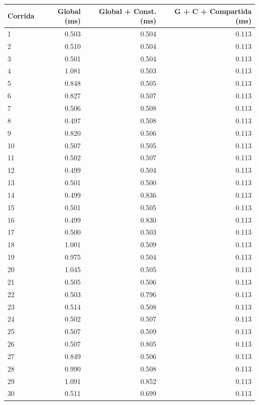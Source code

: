 \begin{tabular}{lrrr}
\toprule
Corrida & Global (ms) & Global + Const. (ms) & G + C + Compartida (ms) \\
\midrule
1 & 0.503 & 0.504 & 0.113 \\
2 & 0.510 & 0.504 & 0.113 \\
3 & 0.501 & 0.504 & 0.113 \\
4 & 1.081 & 0.503 & 0.113 \\
5 & 0.848 & 0.505 & 0.113 \\
6 & 0.827 & 0.507 & 0.113 \\
7 & 0.506 & 0.508 & 0.113 \\
8 & 0.497 & 0.508 & 0.113 \\
9 & 0.820 & 0.506 & 0.113 \\
10 & 0.507 & 0.505 & 0.113 \\
11 & 0.502 & 0.507 & 0.113 \\
12 & 0.499 & 0.504 & 0.113 \\
13 & 0.501 & 0.500 & 0.113 \\
14 & 0.499 & 0.836 & 0.113 \\
15 & 0.501 & 0.505 & 0.113 \\
16 & 0.499 & 0.830 & 0.113 \\
17 & 0.500 & 0.503 & 0.113 \\
18 & 1.001 & 0.509 & 0.113 \\
19 & 0.975 & 0.504 & 0.113 \\
20 & 1.045 & 0.505 & 0.113 \\
21 & 0.505 & 0.506 & 0.113 \\
22 & 0.503 & 0.796 & 0.113 \\
23 & 0.514 & 0.508 & 0.113 \\
24 & 0.502 & 0.507 & 0.113 \\
25 & 0.507 & 0.509 & 0.113 \\
26 & 0.507 & 0.805 & 0.113 \\
27 & 0.849 & 0.506 & 0.113 \\
28 & 0.990 & 0.508 & 0.113 \\
29 & 1.091 & 0.852 & 0.113 \\
30 & 0.511 & 0.699 & 0.113 \\
\bottomrule
\end{tabular}
